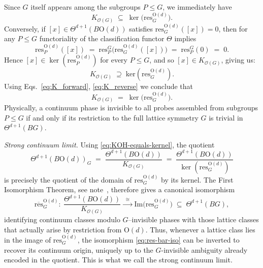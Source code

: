 \documentclass[aps,prx,reprint,superscriptaddress,twocolumn,amsmath,amssymb,amsfonts, nofootinbib]{revtex4-2}
\newcommand{\res}{\text{res}}
\theoremstyle{apsstyle}
\begin{document}
\bigskip 

Since $G$ itself appears among the subgroups $P\le G$, we immediately have
\begin{equation}
    K_{\mathcal{O}(G)}
    \;\subseteq\;
    \ker\bigl(\res^{\mathrm{O}(d)}_{G}\bigr).
    \label{eq:K_forward}
\end{equation}
Conversely, if $[x]\in\Theta^{d+1}(B\mathrm{O}(d))$ satisfies $\res^{\mathrm{O}(d)}_{G}([x])=0$, then for any $P\le G$ functoriality of the classification functor $\Theta$
implies
\begin{equation*}
    \res^{\mathrm{O}(d)}_{P}([x])
    \;=\;
    \res^{G}_{P}\bigl(\res^{\mathrm{O}(d)}_{G}([x])\bigr)
    \;=\;
    \res^{G}_{P}(0)
    \;=\;
    0.
\end{equation*}
Hence $[x]\in\ker(\res^{\mathrm{O}(d)}_{P})$ for every $P\le G$, and so
$[x]\in K_{\mathcal{O}(G)}$, giving us:
\begin{equation}
    K_{\mathcal{O}(G)} \; \supseteq \; \mathrm{ker}(\res^{\mathrm{O}(d)}_{G}).
    \label{eq:K_reverse}
\end{equation}
Using Eqs.~\ref{eq:K_forward}, \ref{eq:K_reverse} we conclude that
\begin{equation}
    K_{\mathcal{O}(G)}
    \;=\;
    \ker\bigl(\res^{\mathrm{O}(d)}_{G}\bigr).
    \label{eq:KOH-equals-kernel}
\end{equation}
Physically, a continuum phase is invisible to all probes assembled from
subgroups $P\le G$ if and only if its restriction to the full lattice
symmetry $G$ is trivial in $\Theta^{d+1}(BG)$.

\medskip

\noindent\textit{Strong continuum limit.}
Using \eqref{eq:KOH-equals-kernel}, the quotient
\begin{equation*}
    \Theta^{d+1}(B\mathrm{O}(d))_{G}
    \;=\;
    \dfrac{\Theta^{d+1}(B\mathrm{O}(d))}{K_{\mathcal{O}(G)}}
    \;=\;
    \dfrac{\Theta^{d+1}(B\mathrm{O}(d))}{\ker(\res^{\mathrm{O}(d)}_{G})}
\end{equation*}
is precisely the quotient of the domain of $\res^{\mathrm{O}(d)}_{G}$ by its
kernel. The First Isomorphism Theorem, see note~\cite{note_fit}, therefore gives a canonical isomorphism
\begin{equation}
    \overline{\res}^{\mathrm{O}(d)}_{G}:\ 
    \dfrac{\Theta^{d+1}(B\mathrm{O}(d))}{K_{\mathcal{O}(G)}}
    \xrightarrow[]{\;\;\cong\;\;}
    \mathrm{Im}\bigl(\res^{\mathrm{O}(d)}_{G}\bigr)
    \;\subseteq\;
    \Theta^{d+1}(BG),
    \label{eq:res-bar-iso}
\end{equation}
identifying continuum classes modulo $G$–invisible phases with those lattice
classes that actually arise by restriction from $\mathrm{O}(d)$. Thus, whenever a lattice class lies in the image of $\res^{\mathrm{O}(d)}_{G}$, the isomorphism \eqref{eq:res-bar-iso} can be inverted to recover its continuum origin, uniquely up to the $G$-invisible ambiguity already encoded in the quotient. This is what we call the strong continuum limit.
\end{document}
